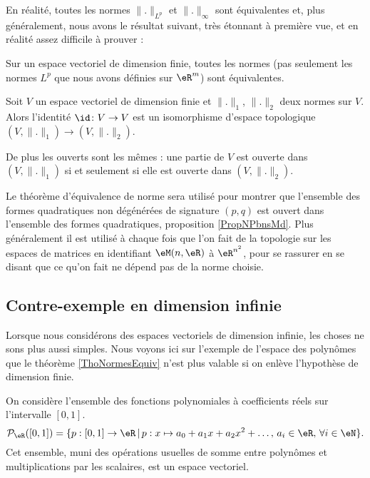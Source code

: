 En réalité, toutes les normes \( \| . \|_{L^p}\) et \( \| . \|_{\infty}\) sont équivalentes et, plus généralement, nous avons le résultat suivant, très étonnant à première vue, et en réalité assez difficile à prouver :
\begin{theorem}		\label{ThoNormesEquiv}
	Sur un espace vectoriel de dimension finie, toutes les normes (pas seulement les normes $L^p$ que nous avons définies sur $\eR^m$) sont équivalentes.
\end{theorem}

\begin{corollary}
    Soit \( V\) un espace vectoriel de dimension finie et \( \| . \|_1\), \( \| . \|_2\) deux normes sur \( V\). Alors l'identité \( \id\colon V\to V\) est un isomorphisme d'espace topologique \( (V,\| . \|_1)\to (V,\| . \|_2)\).

    De plus les ouverts sont les mêmes : une partie de \( V\) est ouverte dans \( (V,\| . \|_1)\) si et seulement si elle est ouverte dans \( (V,\| . \|_2)\).
\end{corollary}

Le théorème d'équivalence de norme sera utilisé pour montrer que l'ensemble des formes quadratiques non dégénérées de signature \( (p,q)\) est ouvert dans l'ensemble des formes quadratiques, proposition \ref{PropNPbnsMd}. Plus généralement il est utilisé à chaque fois que l'on fait de la topologie sur les espaces de matrices en identifiant \( \eM(n,\eR)\) à \( \eR^{n^2}\), pour se rassurer en se disant que ce qu'on fait ne dépend pas de la norme choisie.

\subsection{Contre-exemple en dimension infinie}
\label{SubSecPOlynomesCE}

Lorsque nous considérons des espaces vectoriels de dimension infinie, les choses ne sons plus aussi simples. Nous voyons ici sur l'exemple de l'espace des polynômes que le théorème \ref{ThoNormesEquiv} n'est plus valable si on enlève l'hypothèse de dimension finie.

On considère l'ensemble des fonctions polynomiales à coefficients réels sur  l'intervalle $[0,1]$.
\begin{equation}
\mathcal{P}_\eR([0,1])=\{p:[0,1]\to \eR\,|\, p : x\mapsto a_0+a_1 x +a_2 x^2 + \ldots, \, a_i\in\eR,\,\forall i\in \eN\}.
\end{equation}
Cet ensemble, muni des opérations usuelles de somme entre polynômes et multiplications par les scalaires, est un espace vectoriel.  

